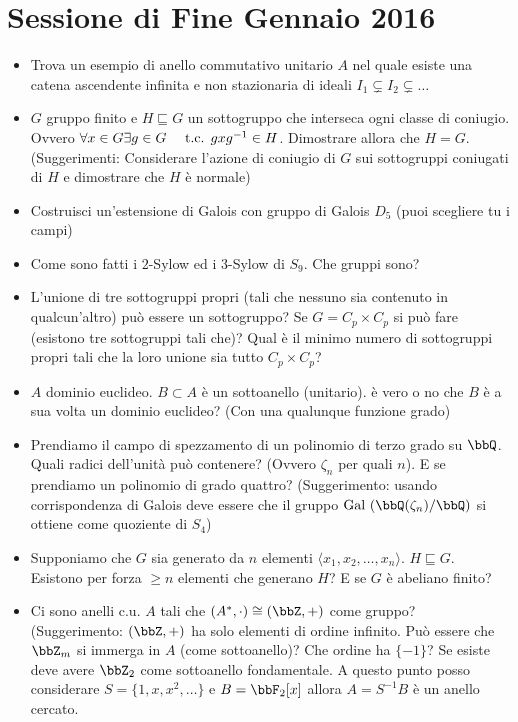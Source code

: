 \documentclass[a4paper,11pt,NoNotes,GeneralMath]{stdmdoc}
\newcommand{\sgr}{\sqsubseteq}
\begin{document}
	\section*{Sessione di Fine Gennaio 2016}
	\begin{itemize}
		\item Trova un esempio di anello commutativo unitario $A$ nel quale esiste una catena ascendente infinita e non stazionaria di ideali $I_1 \subsetneq I_2 \subsetneq \ldots$
		\item $G$ gruppo finito e $H \sgr G$ un sottogruppo che interseca ogni classe di coniugio. Ovvero $\forall x \in G \exists g \in G \quad \mbox{ t.c. } gxg^{-1} \in H$. Dimostrare allora che $H = G$. (Suggerimenti: Considerare l'azione di coniugio di $G$ sui sottogruppi coniugati di $H$ e dimostrare che $H$ è normale)
		\item Costruisci un'estensione di Galois con gruppo di Galois $D_5$ (puoi scegliere tu i campi)
		\item Come sono fatti i $2$-Sylow ed i $3$-Sylow di $S_9$. Che gruppi sono?
		\item L'unione di tre sottogruppi propri (tali che nessuno sia contenuto in qualcun'altro) può essere un sottogruppo? Se $G = C_p \times C_p$ si può fare (esistono tre sottogruppi tali che)? Qual è il minimo numero di sottogruppi propri tali che la loro unione sia tutto $C_p \times C_p$?
		\item $A$ dominio euclideo. $B \subset A$ è un sottoanello (unitario). è vero o no che $B$ è a sua volta un dominio euclideo? (Con una qualunque funzione grado)
		\item Prendiamo il campo di spezzamento di un polinomio di terzo grado su $\bbQ$. Quali radici dell'unità può contenere? (Ovvero $\zeta_n$ per quali $n$). E se prendiamo un polinomio di grado quattro? (Suggerimento: usando corrispondenza di Galois deve essere che il gruppo $\text{Gal }(\bbQ(\zeta_n) / \bbQ)$ si ottiene come quoziente di $S_4$)
		\item Supponiamo che $G$ sia generato da $n$ elementi $\langle x_1, x_2, \ldots, x_n \rangle$. $H \sgr G$. Esistono per forza $\ge n$ elementi che generano $H$? E se $G$ è abeliano finito?
		\item Ci sono anelli c.u. $A$ tali che $(A^{*}, \cdot) \cong (\bbZ, +)$ come gruppo? (Suggerimento: $(\bbZ, +)$ ha solo elementi di ordine infinito. Può essere che $\bbZ_m$ si immerga in $A$ (come sottoanello)? Che ordine ha $\{ -1 \}$? Se esiste deve avere $\bbZ_2$ come sottoanello fondamentale. A questo punto posso considerare $S = \{ 1, x, x^2, \ldots \}$ e $B = \bbF_2[x]$ allora $A = S^{-1}B$ è un anello cercato.

\end{itemize}
\end{document}
